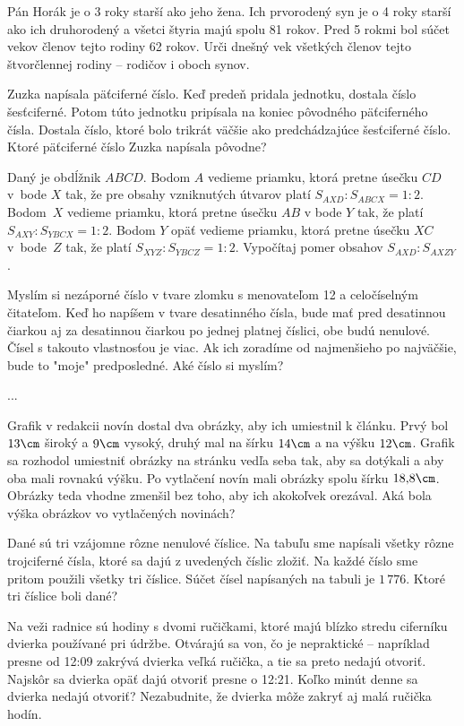{%
Pán Horák je o 3 roky starší ako jeho žena. Ich prvorodený syn je o 4 roky starší ako
ich druhorodený a všetci štyria majú spolu 81 rokov. Pred 5 rokmi bol súčet vekov
členov tejto rodiny 62 rokov. Urči dnešný vek všetkých členov tejto štvorčlennej rodiny
-- rodičov i oboch synov.}

{%
Zuzka napísala päťciferné číslo. Keď predeň pridala jednotku, dostala číslo
šesťciferné. Potom túto jednotku pripísala na koniec pôvodného päťciferného čísla.
Dostala číslo, ktoré bolo trikrát väčšie ako predchádzajúce šesťciferné číslo. Ktoré
päťciferné číslo Zuzka napísala pôvodne?}

{%
Daný je obdĺžnik $ABCD$. Bodom $A$ vedieme priamku, ktorá pretne úsečku $CD$ v~bode
$X$ tak, že pre obsahy vzniknutých útvarov platí $S_{AXD}:S_{ABCX}=1:2$. Bodom~$X$ vedieme
priamku, ktorá pretne úsečku $AB$ v bode $Y$ tak, že platí $S_{AXY}:S_{YBCX}=1:2$. Bodom $Y$
opäť vedieme priamku, ktorá pretne úsečku $XC$ v~bode~$Z$ tak, že platí
$S_{XYZ}:S_{YBCZ}=1:2$.
Vypočítaj pomer obsahov $S_{AXD}:S_{AXZY}$.}

{%
Myslím si nezáporné číslo v tvare zlomku s menovateľom 12 a celočíselným
čitateľom. Keď ho napíšem v tvare desatinného čísla, bude mať pred desatinnou
čiarkou aj za desatinnou čiarkou po jednej platnej číslici, obe budú nenulové. Čísel
s takouto vlastnosťou je viac. Ak ich zoradíme od najmenšieho po najväčšie, bude to
"moje" predposledné. Aké číslo si myslím?}

{%
...}

{%
Grafik v redakcii novín dostal dva obrázky, aby ich umiestnil k článku. Prvý bol $13\cm$
široký a $9\cm$ vysoký, druhý mal na šírku $14\cm$ a na výšku $12\cm$. Grafik sa rozhodol
umiestniť obrázky na stránku vedľa seba tak, aby sa dotýkali a aby oba mali rovnakú
výšku. Po vytlačení novín mali obrázky spolu šírku $18{,}8\cm$. Obrázky teda vhodne
zmenšil bez toho, aby ich akokoľvek orezával. Aká bola výška obrázkov vo
vytlačených novinách?}

{%
Dané sú tri vzájomne rôzne nenulové číslice. Na tabuľu sme napísali všetky rôzne
trojciferné čísla, ktoré sa dajú z uvedených číslic zložiť. Na každé číslo sme pritom
použili všetky tri číslice. Súčet čísel napísaných na tabuli je $1\,776$. Ktoré tri číslice boli
dané?}

{%
Na veži radnice sú hodiny s dvomi ručičkami, ktoré majú blízko stredu
ciferníku dvierka používané pri údržbe. Otvárajú sa von, čo je
nepraktické -- napríklad presne od 12:09 zakrývá dvierka veľká ručička,
a tie sa preto nedajú otvoriť. Najskôr sa dvierka opäť dajú otvoriť presne
o 12:21. Koľko minút denne sa dvierka nedajú otvoriť? Nezabudnite, že
dvierka môže zakryť aj malá ručička hodín.}

